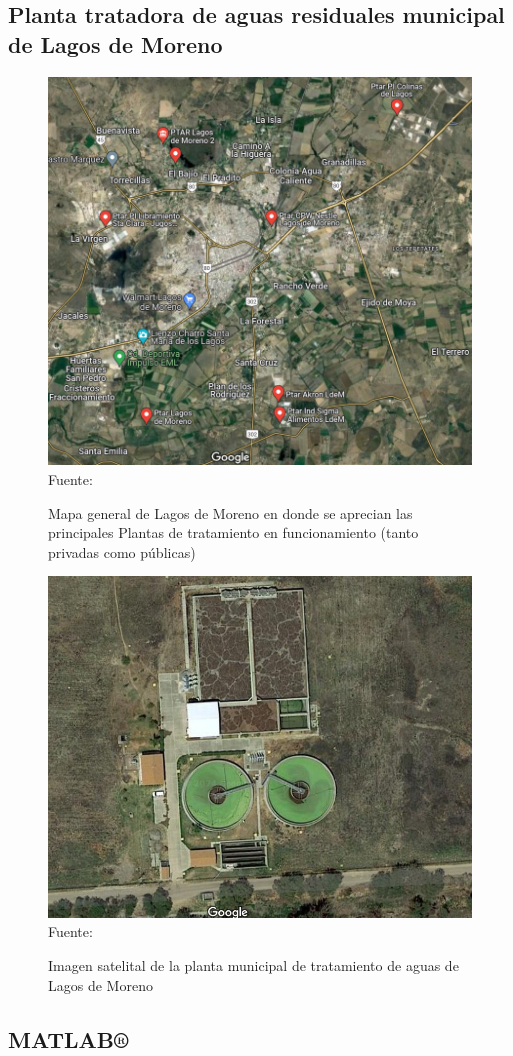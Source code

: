 \subsection{Planta tratadora de aguas residuales municipal de Lagos de Moreno}
\begin{figure}[H]
	\centering
	\includegraphics[scale=0.6]{../Images/PTARs_Lagos.png}
	\\\small{Fuente: \cite{Maps}}
	\caption{Mapa general de Lagos de Moreno en donde se aprecian las principales Plantas de tratamiento en funcionamiento (tanto privadas como públicas)}\label{fig:lgsptars}
\end{figure}
\begin{figure}[H]
	\centering
	\includegraphics[scale=0.5]{../Images/PTAR_Lagos.png}
	\\\small{Fuente: \cite{Maps}}
	\caption{Imagen satelital de la planta municipal de tratamiento de aguas de Lagos de Moreno}\label{fig:lgsptar}
\end{figure}
\subsection{MATLAB®}
